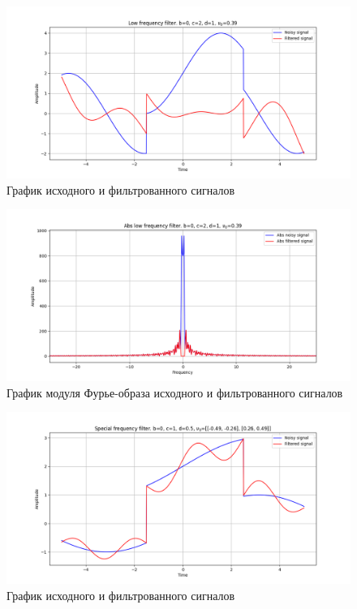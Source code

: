 \documentclass[a4paper, 12pt]{article}
\begin{document}
    \begin{figure}[!htb]
        \centering
        \includegraphics[scale=0.485]{2_2_u_flt_u_nospec.png}
        \captionsetup{skip=0pt}
        \caption{График исходного и фильтрованного сигналов}
        \label{fig:fig81}
    \end{figure}
    \begin{figure}[!htb]
        \centering
        \includegraphics[scale=0.485]{2_2_abs_u_U_nospec.png}
        \captionsetup{skip=0pt}
        \caption{График модуля Фурье-образа исходного и фильтрованного сигналов}
        \label{fig:fig82}
    \end{figure}
    \begin{figure}[!htb]
        \centering
        \includegraphics[scale=0.485]{3_u_flt_u_nospec.png}
        \captionsetup{skip=0pt}
        \caption{График исходного и фильтрованного сигналов}
        \label{fig:fig83}
    \end{figure}
\end{document}
